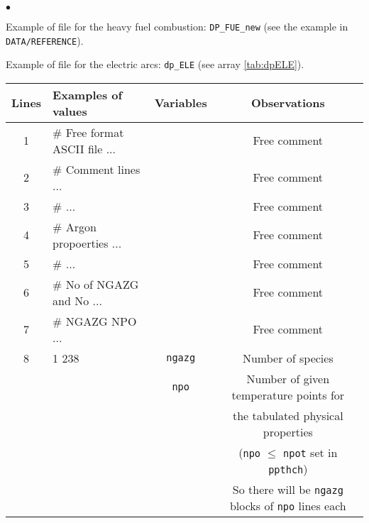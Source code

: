 {{{\begin{list}{$\bullet$}{}
       \item Example of file for the heavy fuel combustion: \texttt{DP\_FUE\_new} (see
             the example in \texttt{DATA/REFERENCE}).

       \item Example of file for the electric arcs: \texttt{dp\_ELE} (see
             array \ref{tab:dpELE}).

\begin{table}[htbp]
\begin{center}
\small{
\begin{tabular}{|c|l|c|c|} \hline
 Lines  &        Examples of values        & Variables & Observations                                       \\ \hline
  1     &\# Free format ASCII file ...     &           & Free comment                                       \\ \hline
  2     &\# Comment lines ...              &           & Free comment                                       \\ \hline
  3     &\#                            ... &           & Free comment                                       \\ \hline
  4     &\# Argon propoerties ...          &           & Free comment                                       \\ \hline
  5     &\#                            ... &           & Free comment                                       \\ \hline
  6     &\# No of NGAZG and No   ... &           & Free comment                                       \\ \hline
  7     &\# NGAZG NPO                  ... &           & Free comment                                       \\ \hline
  8     &    1   238         &    \texttt{ngazg\index{ngazg}}   & Number of species                         \\
        &                    &    \texttt{npo\index{npo}}       & Number of given temperature points for    \\
        &                    &                         & the tabulated physical properties                  \\
        &                    &                         & (\texttt{npo} $\leqslant$ \texttt{npot} set in \texttt{ppthch})             \\
        &                    &                         & So there will be \texttt{ngazg} blocks of \texttt{npo} lines each    \\ \hline

\end{tabular}}
\end{center}
\end{table}
\end{list}}}}
